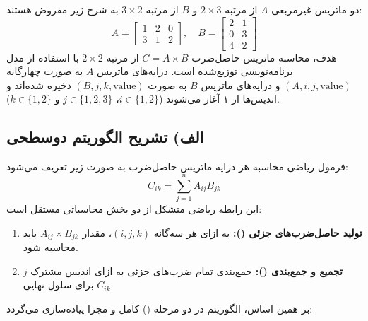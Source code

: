 \documentclass[11pt,a4paper]{article}
\begin{document}
	دو ماتریس غیرمربعی $A$ از مرتبه $2 \times 3$ و $B$ از مرتبه $3 \times 2$ به شرح زیر مفروض هستند:
	\begin{equation}
		A = \begin{bmatrix} 1 & 2 & 0 \\ 3 & 1 & 2 \end{bmatrix}, \quad
		B = \begin{bmatrix} 2 & 1 \\ 0 & 3 \\ 4 & 2 \end{bmatrix}
	\end{equation}
	هدف، محاسبه ماتریس حاصل‌ضرب $C = A \times B$ از مرتبه $2 \times 2$ با استفاده از مدل برنامه‌نویسی توزیع‌شده  است. درایه‌های ماتریس $A$ به صورت چهارگانه $(A, i, j, \text{value})$ و درایه‌های ماتریس $B$ به صورت $(B, j, k, \text{value})$ ذخیره شده‌اند و اندیس‌ها از ۱ آغاز می‌شوند ($i \in \{1, 2\}$، $j \in \{1, 2, 3\}$ و $k \in \{1, 2\}$).
	
	\subsection{الف) تشریح الگوریتم دوسطحی }
	فرمول ریاضی محاسبه هر درایه ماتریس حاصل‌ضرب به صورت زیر تعریف می‌شود:
	\begin{equation}
		C_{ik} = \sum_{j=1}^{n} A_{ij} B_{jk}
	\end{equation}
	این رابطه ریاضی متشکل از دو بخش محاسباتی مستقل است:
	\begin{enumerate}
		\item \textbf{تولید حاصل‌ضرب‌های جزئی ():} به ازای هر سه‌گانه $(i, j, k)$، مقدار $A_{ij} \times B_{jk}$ باید محاسبه شود.
		\item \textbf{تجمیع و جمع‌بندی ():} جمع‌بندی تمام ضرب‌های جزئی به ازای اندیس مشترک $j$ برای سلول نهایی $C_{ik}$.
	\end{enumerate}
	
	بر همین اساس، الگوریتم در دو مرحله () کامل و مجزا پیاده‌سازی می‌گردد:
	
\end{document}

